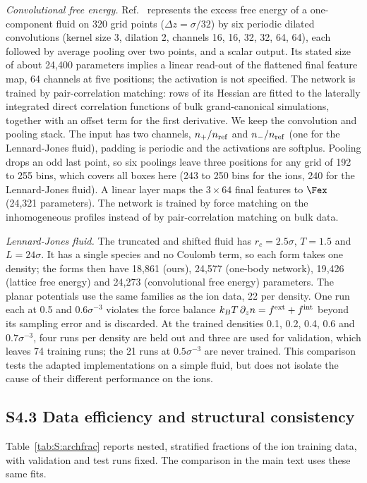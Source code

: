\textit{Convolutional free energy.} Ref.~\cite{dijkman2025learning} represents the excess free energy of a one-component fluid on 320 grid points ($\Delta z=\sigma/32$) by six periodic dilated convolutions (kernel size 3, dilation 2, channels 16, 16, 32, 32, 64, 64), each followed by average pooling over two points, and a scalar output. Its stated size of about 24{,}400 parameters implies a linear read-out of the flattened final feature map, 64 channels at five positions; the activation is not specified. The network is trained by pair-correlation matching: rows of its Hessian are fitted to the laterally integrated direct correlation functions of bulk grand-canonical simulations, together with an offset term for the first derivative. We keep the convolution and pooling stack. The input has two channels, $n_+/n_{\rm ref}$ and $n_-/n_{\rm ref}$ (one for the Lennard-Jones fluid), padding is periodic and the activations are softplus. Pooling drops an odd last point, so six poolings leave three positions for any grid of 192 to 255 bins, which covers all boxes here (243 to 250 bins for the ions, 240 for the Lennard-Jones fluid). A linear layer maps the $3\times64$ final features to $\Fex$ (24{,}321 parameters). The network is trained by force matching on the inhomogeneous profiles instead of by pair-correlation matching on bulk data.

\textit{Lennard-Jones fluid.} The truncated and shifted fluid has $r_c=2.5\sigma$, $T=1.5$ and $L=24\sigma$. It has a single species and no Coulomb term, so each form takes one density; the forms then have 18{,}861 (ours), 24{,}577 (one-body network), 19{,}426 (lattice free energy) and 24{,}273 (convolutional free energy) parameters. The planar potentials use the same families as the ion data, 22 per density. One run each at 0.5 and $0.6\sigma^{-3}$ violates the force balance $k_BT\,\partial_zn=f^{\rm ext}+f^{\rm int}$ beyond its sampling error and is discarded. At the trained densities 0.1, 0.2, 0.4, 0.6 and $0.7\sigma^{-3}$, four runs per density are held out and three are used for validation, which leaves 74 training runs; the 21 runs at $0.5\sigma^{-3}$ are never trained. This comparison tests the adapted implementations on a simple fluid, but does not isolate the cause of their different performance on the ions.

\subsection*{S4.3 Data efficiency and structural consistency}
Table~\ref{tab:S:archfrac} reports nested, stratified fractions of the ion training data, with validation and test runs fixed. The comparison in the main text uses these same fits.

